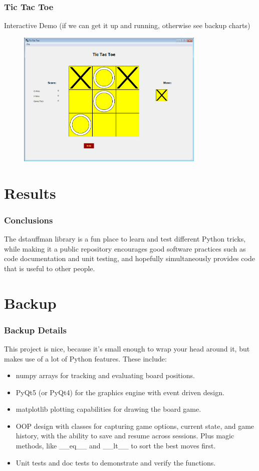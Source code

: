 \documentclass{beamer}
\begin{document}
\begin{frame}
	\frametitle{Tic Tac Toe}
    Interactive Demo (if we can get it up and running, otherwise see backup charts)
    \begin{figure}
        \centering
        \includegraphics[width=0.8\textwidth]{TicTacToe_Board.png}
    \end{figure}
\end{frame}

\section{Results}
\begin{frame}
	\frametitle{Conclusions}
    The dstauffman library is a fun place to learn and test different Python tricks, while making it a public repository encourages good software practices such as code documentation and unit testing, and hopefully simultaneously provides code that is useful to other people.
\end{frame}

\section{Backup}
\frame{\sectionpage}

\begin{frame}
	\frametitle{Backup Details}
	This project is nice, because it's small enough to wrap your head around it, but makes use of a lot of Python features.  These include:
	\begin{itemize}
		\item numpy arrays for tracking and evaluating board positions.
		\item PyQt5 (or PyQt4) for the graphics engine with event driven design.
		\item matplotlib plotting capabilities for drawing the board game.
		\item OOP design with classes for capturing game options, current state, and game history, with the ability to save and resume across sessions.  Plus magic methods, like \_\_eq\_\_ and \_\_lt\_\_  to sort the best moves first.
		\item Unit tests and doc tests to demonstrate and verify the functions.
	\end{itemize}
\end{frame}
\end{document}
